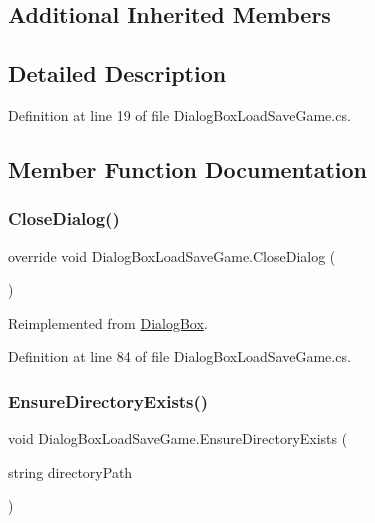 \subsection*{Additional Inherited Members}


\subsection{Detailed Description}


Definition at line 19 of file Dialog\+Box\+Load\+Save\+Game.\+cs.



\subsection{Member Function Documentation}
\mbox{\label{class_dialog_box_load_save_game_ad3b5e6ab617a831b4db61010812e7665}} 
\subsubsection{\texorpdfstring{Close\+Dialog()}{CloseDialog()}}
{\footnotesize\ttfamily override void Dialog\+Box\+Load\+Save\+Game.\+Close\+Dialog (\begin{DoxyParamCaption}{ }\end{DoxyParamCaption})\hspace{0.3cm}{\ttfamily [virtual]}}



Reimplemented from \hyperlink{class_dialog_box_ad4f408b78d5e109525c229ad34f5a447}{Dialog\+Box}.



Definition at line 84 of file Dialog\+Box\+Load\+Save\+Game.\+cs.

\mbox{\label{class_dialog_box_load_save_game_adb463c1d803a7e68e0378b6e48fb2a85}} 
\subsubsection{\texorpdfstring{Ensure\+Directory\+Exists()}{EnsureDirectoryExists()}}
{\footnotesize\ttfamily void Dialog\+Box\+Load\+Save\+Game.\+Ensure\+Directory\+Exists (\begin{DoxyParamCaption}\item[{string}]{directory\+Path }\end{DoxyParamCaption})}



